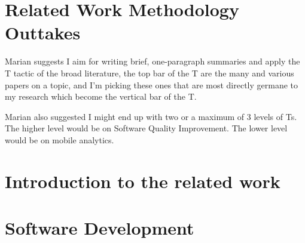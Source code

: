 \section{Related Work Methodology Outtakes}
Marian suggests I aim for writing brief, one-paragraph summaries and apply the T tactic of the broad literature, the top bar of the T are the many and various papers on a topic, and I'm picking these ones that are most directly germane to my research which become the vertical bar of the T. 

Marian also suggested I might end up with two or a maximum of 3 levels of Ts. The higher level would be on Software Quality Improvement. The lower level would be on mobile analytics.

\section{Introduction to the related work}

\section{Software Development}
